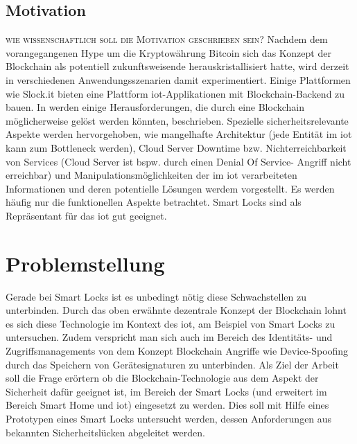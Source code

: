     \subsection*{Motivation}
    \textsc{wie wissenschaftlich soll die Motivation geschrieben sein?}
    \noindent Nachdem dem vorangegangenen Hype um die Kryptowährung Bitcoin sich das Konzept der Blockchain als potentiell zukunftsweisende herauskristallisiert hatte, wird derzeit in verschiedenen Anwendungsszenarien damit experimentiert. 
    Einige Plattformen wie Slock.it bieten eine Plattform \gls{iot}-Applikationen mit Blockchain-Backend zu bauen. 
    In \cite{Kshetri2017} werden einige Herausforderungen, die durch eine Blockchain möglicherweise gelöst werden könnten, beschrieben. 
    Spezielle sicherheitsrelevante Aspekte werden hervorgehoben, wie mangelhafte Architektur (jede Entität im \gls{iot} kann zum Bottleneck werden), Cloud Server Downtime bzw. Nichterreichbarkeit von Services (Cloud Server ist bspw. durch einen Denial Of Service- Angriff nicht erreichbar) und Manipulationsmöglichkeiten der im \gls{iot} verarbeiteten Informationen  und deren potentielle Lösungen werdem vorgestellt. 
    Es werden häufig nur die funktionellen Aspekte betrachtet. 
    Smart Locks sind als Repräsentant für das \gls{iot} gut geeignet.
    
\section{Problemstellung}
\label{sec:problem}
    Gerade bei Smart Locks ist es unbedingt nötig diese Schwachstellen zu unterbinden.
    Durch das oben erwähnte dezentrale Konzept der Blockchain\cite{Nakamoto2008} lohnt es sich diese Technologie im Kontext des \gls{iot}, am Beispiel von Smart Locks zu untersuchen.
    Zudem verspricht man sich auch im Bereich des Identitäts- und Zugriffsmanagements von dem Konzept Blockchain Angriffe wie Device-Spoofing durch das Speichern von Gerätesignaturen zu unterbinden\cite{Kshetri2017}.
    \newline
    \noindent Als Ziel der Arbeit soll die Frage erörtern ob die Block\-chain\--Tech\-no\-lo\-gie aus dem Aspekt der Sicherheit dafür geeignet ist, im Bereich der Smart Locks (und erweitert im Bereich Smart Home und \gls{iot}) eingesetzt zu werden.
    Dies soll mit Hilfe eines Prototypen eines Smart Locks untersucht werden, dessen Anforderungen aus bekannten Sicherheitslücken abgeleitet werden.
    
